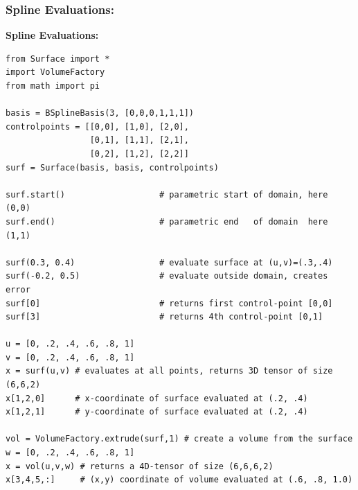 \documentclass{beamer}
\theoremstyle{plain}
\theoremstyle{definition}
\begin{document}
\begin{frame}[fragile]
\frametitle{Spline Evaluations:}
\textbf{Spline Evaluations:}
\begin{listing}[H]
    \tiny
    \begin{verbatim}
from Surface import *
import VolumeFactory
from math import pi

basis = BSplineBasis(3, [0,0,0,1,1,1])
controlpoints = [[0,0], [1,0], [2,0],
                 [0,1], [1,1], [2,1],
                 [0,2], [1,2], [2,2]]
surf = Surface(basis, basis, controlpoints)

surf.start()                   # parametric start of domain, here (0,0)
surf.end()                     # parametric end   of domain  here (1,1)

surf(0.3, 0.4)                 # evaluate surface at (u,v)=(.3,.4)
surf(-0.2, 0.5)                # evaluate outside domain, creates error
surf[0]                        # returns first control-point [0,0]
surf[3]                        # returns 4th control-point [0,1]

u = [0, .2, .4, .6, .8, 1]
v = [0, .2, .4, .6, .8, 1]
x = surf(u,v) # evaluates at all points, returns 3D tensor of size (6,6,2)
x[1,2,0]      # x-coordinate of surface evaluated at (.2, .4)
x[1,2,1]      # y-coordinate of surface evaluated at (.2, .4)

vol = VolumeFactory.extrude(surf,1) # create a volume from the surface
w = [0, .2, .4, .6, .8, 1]
x = vol(u,v,w) # returns a 4D-tensor of size (6,6,6,2)
x[3,4,5,:]     # (x,y) coordinate of volume evaluated at (.6, .8, 1.0)
    \end{verbatim}
\end{listing}

\end{frame}

\end{document}
